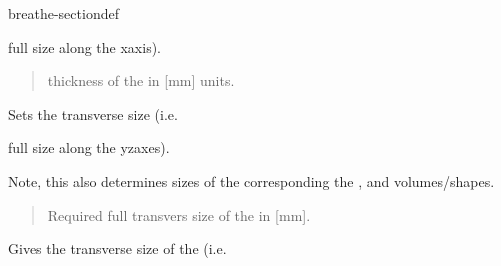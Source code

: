 \documentclass[letterpaper,10pt,english]{sphinxmanual}
\begin{document}
\begin{fulllineitems}
\begin{sphinxuseclass}{breathe-sectiondef}
\begin{fulllineitems}
\sphinxAtStartPar
full size along the x\sphinxhyphen{}axis). \begin{quote}\begin{description}
\sphinxAtStartPar
thickness of the  in {[}mm{]} units. 

\end{description}\end{quote}


\end{fulllineitems}


\begin{fulllineitems}
\label{\detokenize{Simulation/SimulationCodeDoc:_CPPv4N8Geometry13SetCaloSizeYZEd}}
\pysigstartsignatures
\pysigstartmultiline
{}
\pysigstopmultiline
\pysigstopsignatures
\sphinxAtStartPar
Sets the transverse size (i.e. 

\sphinxAtStartPar
full size along the yz\sphinxhyphen{}axes).

\sphinxAtStartPar
Note, this also determines  sizes of the corresponding the ,  and  volumes/shapes.

\sphinxAtStartPar
\begin{quote}\begin{description}
\sphinxAtStartPar
\sphinxstylestrong{{[}in{]}} Required full transvers size of the  in {[}mm{]}. 

\end{description}\end{quote}


\end{fulllineitems}


\begin{fulllineitems}
\label{\detokenize{Simulation/SimulationCodeDoc:_CPPv4NK8Geometry13GetCaloSizeYZEv}}
\pysigstartsignatures
\pysigstartmultiline
{}
\pysigstopmultiline
\pysigstopsignatures
\sphinxAtStartPar
Gives the transverse size of the  (i.e. 


\end{fulllineitems}
\end{sphinxuseclass}
\end{fulllineitems}
\end{document}
